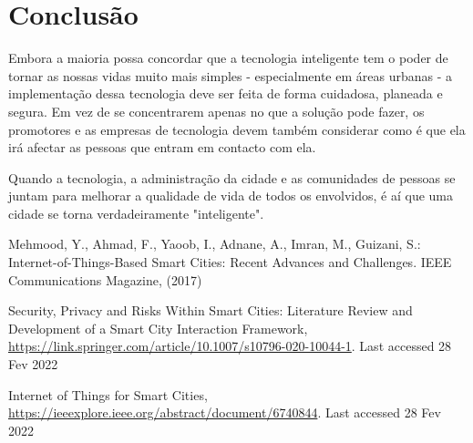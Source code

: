 \documentclass{llncs}
\begin{document}
    
    
\newpage
\section{Conclusão}
    \par Embora a maioria possa concordar que a tecnologia inteligente tem o poder de tornar as nossas vidas muito mais simples - especialmente em áreas urbanas - a implementação dessa tecnologia deve ser feita de forma cuidadosa, planeada e segura. Em vez de se concentrarem apenas no que a solução pode fazer, os promotores e as empresas de tecnologia devem também considerar como é que ela irá afectar as pessoas que entram em contacto com ela.
    \par Quando a tecnologia, a administração da cidade e as comunidades de pessoas se juntam para melhorar a qualidade de vida de todos os envolvidos, é aí que uma cidade se torna verdadeiramente "inteligente".
    
    
    
    
\mbox{}
\vfill
\begin{thebibliography}{8}
Mehmood, Y., Ahmad, F., Yaoob, I., Adnane, A., Imran, M., Guizani, S.: Internet-of-Things-Based Smart Cities: Recent Advances and Challenges. IEEE Communications Magazine, (2017)


Security, Privacy and Risks Within Smart Cities: Literature Review and Development of a Smart City Interaction Framework, \url{https://link.springer.com/article/10.1007/s10796-020-10044-1}. Last accessed 28 Fev 2022


Internet of Things for Smart Cities, \url{https://ieeexplore.ieee.org/abstract/document/6740844}. Last accessed 28 Fev 2022



\end{thebibliography}
\end{document}
